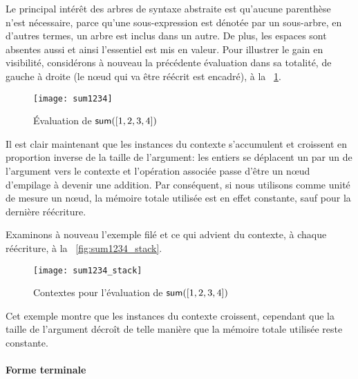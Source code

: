 Le principal intérêt des arbres de syntaxe abstraite est qu'aucune
parenthèse n'est nécessaire, parce qu'une sous-expression est dénotée
par un sous-arbre, en d'autres termes, un arbre est inclus dans un
autre. De plus, les espaces sont absentes aussi et ainsi l'essentiel
est mis en valeur. Pour illustrer le gain en visibilité, considérons à
nouveau la précédente évaluation dans sa totalité, de gauche à droite
(le nœud qui va être réécrit est encadré), à la
\fig~\ref{fig:sum1234}.
\begin{figure}
\centering
\texttt{[image: sum1234]}
\caption{Évaluation de \(\textsf{sum}([1,2,3,4])\)}
\label{fig:sum1234}
\end{figure}
Il est clair maintenant que les instances du contexte s'accumulent et
croissent en proportion inverse de la taille de l'argument: les
entiers se déplacent un par un de l'argument vers le contexte et
l'opération associée passe d'être un nœud
d'empilage à devenir une addition. Par
conséquent, si nous utilisons comme unité de mesure un nœud, la
mémoire totale utilisée est en effet constante, sauf pour la dernière
réécriture.

Examinons à nouveau l'exemple filé et ce qui advient du contexte, à
chaque réécriture, à la \fig~\vref{fig:sum1234_stack}.
\begin{figure}
\centering
\texttt{[image: sum1234\_stack]}
\caption{Contextes pour l'évaluation de \(\textsf{sum}([1,2,3,4])\)}
\label{fig:sum1234_stack}
\end{figure}
Cet exemple montre que les instances du contexte croissent, cependant
que la taille de l'argument décroît de telle manière que la mémoire
totale utilisée reste constante.



\paragraph{Forme terminale}
\label{sec:tail}

